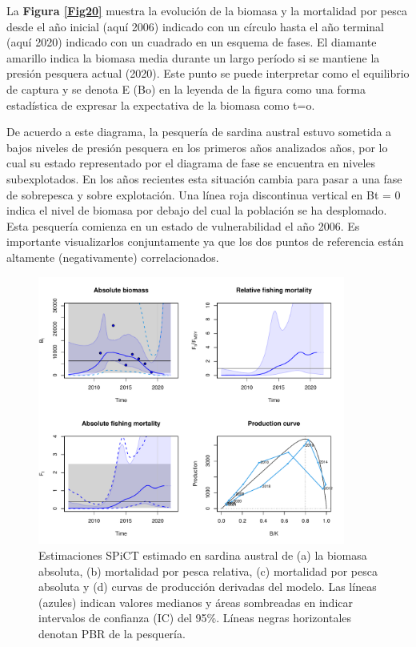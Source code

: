 \documentclass[
  spanish,
]{article}
\begin{document}
La \textbf{Figura \ref{Fig20}} muestra la evolución de la biomasa y la
mortalidad por pesca desde el año inicial (aquí 2006) indicado con un
círculo hasta el año terminal (aquí 2020) indicado con un cuadrado en un
esquema de fases. El diamante amarillo indica la biomasa media durante
un largo período si se mantiene la presión pesquera actual (2020). Este
punto se puede interpretar como el equilibrio de captura y se denota E
(Bo) en la leyenda de la figura como una forma estadística de expresar
la expectativa de la biomasa como t=o.

De acuerdo a este diagrama, la pesquería de sardina austral estuvo
sometida a bajos niveles de presión pesquera en los primeros años
analizados años, por lo cual su estado representado por el diagrama de
fase se encuentra en niveles subexplotados. En los años recientes esta
situación cambia para pasar a una fase de sobrepesca y sobre
explotación. Una línea roja discontinua vertical en Bt = 0 indica el
nivel de biomasa por debajo del cual la población se ha desplomado. Esta
pesquería comienza en un estado de vulnerabilidad el año 2006. Es
importante visualizarlos conjuntamente ya que los dos puntos de
referencia están altamente (negativamente) correlacionados.

\begin{figure}[h!]
\centering
\includegraphics[width=0.9\textwidth]{SPiCT/Figuras/Salidas-1.pdf}
\caption{Estimaciones SPiCT estimado en sardina austral de (a) la biomasa absoluta, (b) mortalidad por pesca relativa, (c)  mortalidad por pesca absoluta y (d)  curvas de producción derivadas del modelo. Las líneas (azules) indican valores medianos y áreas sombreadas en indicar intervalos de confianza (IC) del 95\%. Líneas negras horizontales denotan PBR de la pesquería.}
\label{Fig19}
\end{figure}
\end{document}
